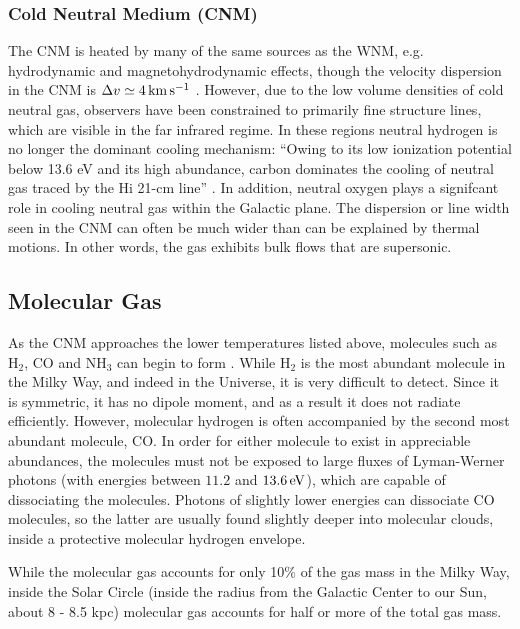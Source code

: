 \documentclass[../dissertation.tex]{subfiles}
\begin{document}
\subsubsection{Cold Neutral Medium (CNM)}
The CNM is heated by many of the same sources as the WNM, 
e.g. hydrodynamic and magnetohydrodynamic effects, though the velocity dispersion in the CNM is $\Delta v \simeq 4 \,\rm km\,s^{-1}$ \citep[p. 49]{2009ARA&A..47...27K}.
However, due to the low volume densities of cold neutral gas, observers have been constrained to 
primarily fine structure lines, which are visible in the far infrared regime. 
In these regions neutral hydrogen is no longer the dominant cooling mechanism: 
``Owing to its low ionization potential below 13.6 eV and its high abundance, carbon dominates the cooling of neutral gas traced by the Hi 21-cm line'' \citep[p. 48]{2009ARA&A..47...27K}. 
In addition, neutral oxygen plays a signifcant role in cooling neutral gas within the Galactic plane. The dispersion or line width seen in the CNM can often be much wider than can be explained by thermal motions. In other words, the gas exhibits bulk flows that are supersonic. 


\subsection{Molecular Gas} \label{subsec:intro_molecular_gas}
As the CNM approaches the lower temperatures listed above, molecules such as H$_2$, CO and NH$_3$ can begin to form \citep[p. 47]{2009ARA&A..47...27K}. 
While H$_2$ is the most abundant molecule in the Milky Way, and indeed in the Universe, it is very difficult to detect. 
Since it is symmetric, it has no dipole moment, and as a result it does not radiate efficiently. 
However, molecular hydrogen is often accompanied by the second most abundant molecule, CO. 
In order for either molecule to exist in appreciable abundances, the molecules must not be exposed to large fluxes of Lyman-Werner photons (with energies between $11.2$ and $13.6\,{\rm eV}$), which are capable of dissociating the molecules. Photons of slightly lower energies can dissociate CO molecules, so the latter are usually found slightly deeper into molecular clouds, inside a protective molecular hydrogen envelope.

While the molecular gas accounts for only 10\% of the gas mass in the Milky Way, inside the Solar Circle (inside the radius from the Galactic Center to our Sun, about 8 - 8.5 kpc) 
molecular gas accounts for half or more of the total gas mass. 
\end{document}
